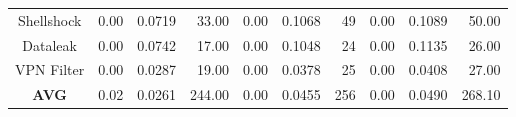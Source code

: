 \begin{table*}[t]
{\begin{tabular}{crrrrrrrrr}
Shellshock           & 0.00                                                                      & 0.0719                                                                    & 33.00                                                                     & 0.00                                                                         & 0.1068                                                                   & 49                                                                        & 0.00                                                                      & 0.1089                                                                      & 50.00                                                                     \\ 
Dataleak             & 0.00                                                                      & 0.0742                                                                    & 17.00                                                                     & 0.00                                                                         & 0.1048                                                                   & 24                                                                        & 0.00                                                                      & 0.1135                                                                      & 26.00                                                                     \\ 
VPN Filter            & 0.00                                                                      & 0.0287                                                                    & 19.00                                                                     & 0.00                                                                         & 0.0378                                                                   & 25                                                                        & 0.00                                                                      & 0.0408                                                                      & 27.00                                                                     \\ 
\textbf{AVG}         & 0.02                                                                      & 0.0261                                                                    & 244.00                                                                    & 0.00                                                                         & 0.0455                                                                   & 256                                                                       & 0.00                                                                      & 0.0490                                                                      & 268.10                                                                    \\ \hline
\end{tabular}
}
\end{table*}